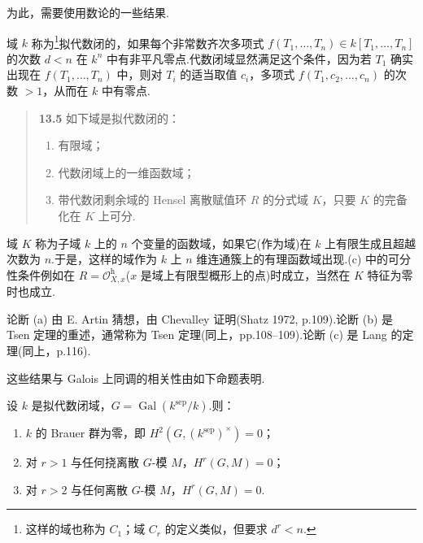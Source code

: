 为此，需要使用数论的一些结果.

域 $k$ 称为\footnote{这样的域也称为 $C_1$；域 $C_r$ 的定义类似，但要求 $d^{r} < n$.}拟代数闭的，如果每个非常数齐次多项式 $f(T_1, \ldots, T_n) \in k[T_1, \ldots, T_n]$ 的次数 $d < n$ 在 $k^{n}$ 中有非平凡零点.代数闭域显然满足这个条件，因为若 $T_1$ 确实出现在 $f(T_1, \ldots, T_n)$ 中，则对 $T_i$ 的适当取值 $c_i$，多项式 $f(T_1, c_2, \ldots, c_n)$ 的次数 $> 1$，从而在 $k$ 中有零点.

\begin{quote}
\label{item:13.5}
\textbf{13.5} 如下域是拟代数闭的：
\begin{enumerate}
  \item 有限域；
  \item 代数闭域上的一维函数域；
  \item 带代数闭剩余域的 Hensel 离散赋值环 $R$ 的分式域 $K$，只要 $K$ 的完备化在 $K$ 上可分.
\end{enumerate}
\end{quote}

域 $K$ 称为子域 $k$ 上的 $n$ 个变量的函数域，如果它(作为域)在 $k$ 上有限生成且超越次数为 $n$.于是，这样的域作为 $k$ 上 $n$ 维连通簇上的有理函数域出现.(c) 中的可分性条件例如在 $R = \mathcal{O}^{\mathrm{h}}_{X, x}$($x$ 是域上有限型概形上的点)时成立，当然在 $K$ 特征为零时也成立.

论断 (a) 由 E. Artin 猜想，由 Chevalley 证明(Shatz 1972, p.109).论断 (b) 是 Tsen 定理的重述，通常称为 Tsen 定理(同上，pp.108--109).论断 (c) 是 Lang 的定理(同上，p.116).

这些结果与 Galois 上同调的相关性由如下命题表明.

\begin{proposition}\label{prop:13.6}
设 $k$ 是拟代数闭域，$G = \operatorname{Gal}(k^{\mathrm{sep}}/k)$.则：
\begin{enumerate}
  \item $k$ 的 Brauer 群为零，即 $H^{2}(G, (k^{\mathrm{sep}})^{\times}) = 0$；
  \item 对 $r > 1$ 与任何挠离散 $G$-模 $M$，$H^{r}(G, M) = 0$；
  \item 对 $r > 2$ 与任何离散 $G$-模 $M$，$H^{r}(G, M) = 0$.
\end{enumerate}
\end{proposition}

